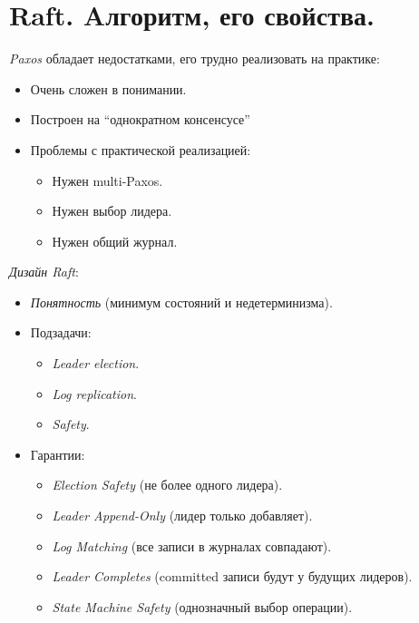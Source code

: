 \section{Raft. Aлгоритм, его свойства.}

\begin{remark}
    \textit{Paxos} обладает недостатками,
    его трудно реализовать на практике:
    \begin{itemize}
        \item Очень сложен в понимании.
        \item Построен на ``однократном консенсусе''
        \item Проблемы с практической реализацией:
            \begin{itemize}
                \item Нужен multi-Paxos.
                \item Нужен выбор лидера.
                \item Нужен общий журнал.
            \end{itemize}
    \end{itemize}
\end{remark}

\begin{definition} \textit{Дизайн Raft}:
    \begin{itemize}
        \item \textit{Понятность} (минимум состояний и недетерминизма).
        \item Подзадачи:
            \begin{itemize}
                \item \textit{Leader election}.
                \item \textit{Log replication}.
                \item \textit{Safety}.
            \end{itemize}
        \item Гарантии:
            \begin{itemize}
                \item \textit{Election Safety} (не более одного лидера).
                \item \textit{Leader Append-Only} (лидер только добавляет).
                \item \textit{Log Matching} (все записи в журналах совпадают).
                \item \textit{Leader Completes} (committed записи будут у будущих лидеров).
                \item \textit{State Machine Safety} (однозначный выбор операции).
            \end{itemize}
    \end{itemize}
\end{definition}

